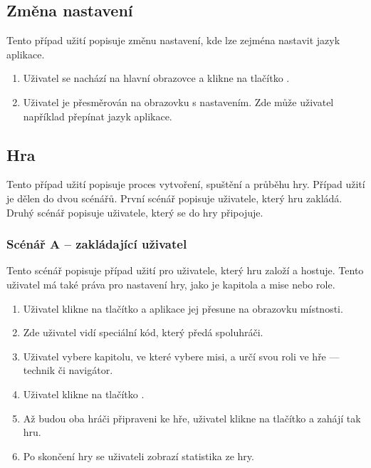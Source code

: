 \subsection{Změna nastavení}

Tento případ užití popisuje změnu nastavení,
kde lze zejména nastavit jazyk aplikace.

\begin{enumerate}
    \item Uživatel se nachází na hlavní obrazovce a klikne na tlačítko
    .
    \item Uživatel je přesměrován na obrazovku s nastavením.
    Zde může uživatel například přepínat jazyk aplikace.
\end{enumerate}

\subsection{Hra}

Tento případ užití popisuje proces vytvoření, spuštění a průběhu hry.
Případ užití je dělen do dvou scénářů.
První scénář popisuje uživatele,
který hru zakládá.
Druhý scénář popisuje uživatele,
který se do hry připojuje.

\subsubsection*{Scénář A -- zakládající uživatel}

Tento scénář popisuje případ užití pro uživatele,
který hru založí a hostuje.
Tento uživatel má také práva pro nastavení hry,
jako je kapitola a mise nebo role.

\begin{enumerate}
    \item Uživatel klikne na tlačítko 
    a aplikace jej přesune na obrazovku místnosti.
    \item Zde uživatel vidí speciální kód,
    který předá spoluhráči.
    \item Uživatel vybere kapitolu,
    ve které vybere misi,
    a určí svou roli ve hře
    --- technik či navigátor.
    \item Uživatel klikne na tlačítko .
    \item Až budou oba hráči připraveni ke hře,
    uživatel klikne na tlačítko  a zahájí tak hru.
    \item Po skončení hry se uživateli zobrazí statistika ze hry.
\end{enumerate}

